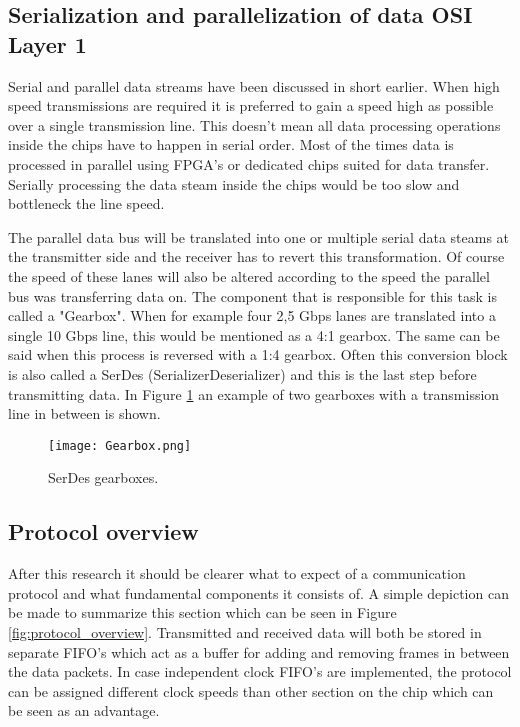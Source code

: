 \subsection[Serialization and parallelization of data]{Serialization and parallelization of data \hfill OSI Layer 1}
Serial and parallel data streams have been discussed in short earlier. When high speed transmissions are required it is preferred to gain a speed high as possible over a single transmission line. This doesn't mean all data processing operations inside the chips have to happen in serial order. Most of the times data is processed in parallel using FPGA's or dedicated chips suited for data transfer. Serially processing the data steam inside the chips would be too slow and bottleneck the line speed.

The parallel data bus will be translated into one or multiple serial data steams at the transmitter side and the receiver has to revert this transformation. Of course the speed of these lanes will also be altered according to the speed the parallel bus was transferring data on. The component that is responsible for this task is called a "Gearbox". When for example four 2,5 Gbps lanes are translated into a single 10 Gbps line, this would be mentioned as a 4:1 gearbox. The same can be said when this process is reversed with a 1:4 gearbox. Often this conversion block is also called a SerDes (SerializerDeserializer) and this is the last step before transmitting data. In Figure \ref{fig:gearbox} an example of two gearboxes with a transmission line in between is shown. \cite{Gearbox}

\begin{figure}[H]
	\centering
	\texttt{[image: Gearbox.png]}	
	\caption{SerDes gearboxes.}
	\label{fig:gearbox}
\end{figure} 

\newpage
\subsection{Protocol overview}
After this research it should be clearer what to expect of a communication protocol and what fundamental components it consists of. A simple depiction can be made to summarize this section which can be seen in Figure \ref{fig:protocol_overview}. Transmitted and received data will both be stored in separate FIFO's which act as a buffer for adding and removing frames in between the data packets. In case independent clock FIFO's are implemented, the protocol can be assigned different clock speeds than other section on the chip which can be seen as an advantage.

